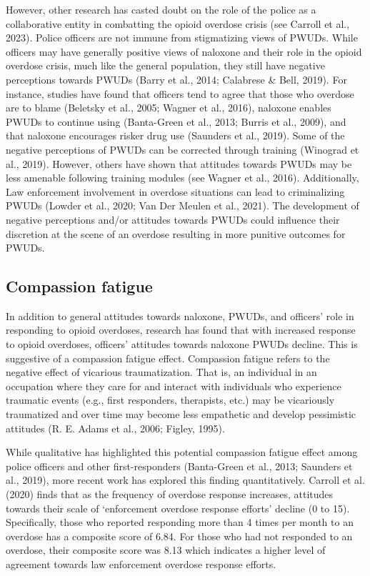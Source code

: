 However, other research has casted doubt on the role of the police as a collaborative entity in combatting the opioid overdose crisis (see Carroll et al., 2023). Police officers are not immune from stigmatizing views of PWUDs. While officers may have generally positive views of naloxone and their role in the opioid overdose crisis, much like the general population, they still have negative perceptions towards PWUDs (Barry et al., 2014; Calabrese \& Bell, 2019). For instance, studies have found that officers tend to agree that those who overdose are to blame (Beletsky et al., 2005; Wagner et al., 2016), naloxone enables PWUDs to continue using (Banta-Green et al., 2013; Burris et al., 2009), and that naloxone encourages risker drug use (Saunders et al., 2019). Some of the negative perceptions of PWUDs can be corrected through training (Winograd et al., 2019). However, others have shown that attitudes towards PWUDs may be less amenable following training modules (see Wagner et al., 2016). Additionally, Law enforcement involvement in overdose situations can lead to criminalizing PWUDs (Lowder et al., 2020; Van Der Meulen et al., 2021). The development of negative perceptions and/or attitudes towards PWUDs could influence their discretion at the scene of an overdose resulting in more punitive outcomes for PWUDs.

\subsection{Compassion fatigue}

In addition to general attitudes towards naloxone, PWUDs, and officers’ role in responding to opioid overdoses, research has found that with increased response to opioid overdoses, officers’ attitudes towards naloxone PWUDs decline. This is suggestive of a compassion fatigue effect. Compassion fatigue refers to the negative effect of vicarious traumatization. That is, an individual in an occupation where they care for and interact with individuals who experience traumatic events (e.g., first responders, therapists, etc.) may be vicariously traumatized and over time may become less empathetic and develop pessimistic attitudes (R. E. Adams et al., 2006; Figley, 1995). 

While qualitative has highlighted this potential compassion fatigue effect among police officers and other first-responders (Banta-Green et al., 2013; Saunders et al., 2019), more recent work has explored this finding quantitatively. Carroll et al. (2020) finds that as the frequency of overdose response increases, attitudes towards their scale of ‘enforcement overdose response efforts’ decline (0 to 15). Specifically, those who reported responding more than 4 times per month to an overdose has a composite score of 6.84. For those who had not responded to an overdose, their composite score was 8.13 which indicates a higher level of agreement towards law enforcement overdose response efforts. 

